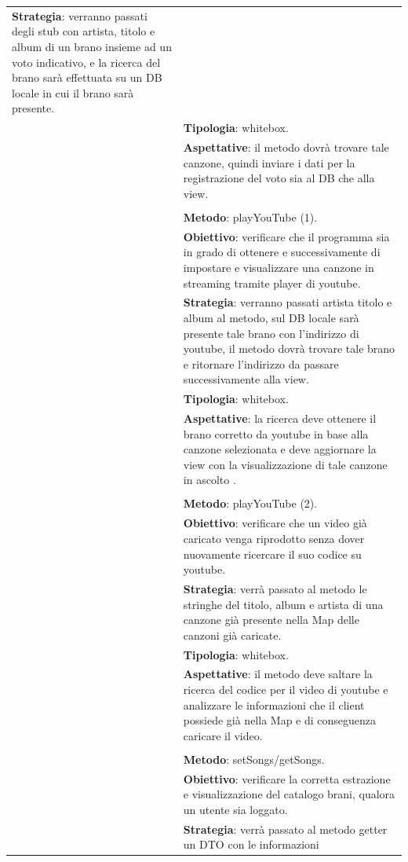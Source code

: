 \begin{footnotesize}
\begin{longtable}{|p{5.7cm}|p{10.3cm}|}
\textbf{Strategia}: verranno passati degli stub con artista, titolo e album di
un brano insieme ad un voto indicativo, e la ricerca del brano sar\`a
effettuata su un DB locale in cui il brano sar\`a presente.\\&
\textbf{Tipologia}: whitebox.\\&
\textbf{Aspettative}: il metodo dovr\`a trovare tale canzone, quindi inviare i
dati per la registrazione del voto sia al DB che alla view.\\&
\\&
\textbf{Metodo}: playYouTube (1).\\&
\textbf{Obiettivo}: verificare che il
programma sia in grado di ottenere e successivamente di impostare e visualizzare una canzone in streaming tramite
player di youtube.\\&
\textbf{Strategia}: verranno passati artista titolo e album al metodo, sul DB
locale sar\`a presente tale brano con l'indirizzo di youtube, il metodo
dovr\`a trovare tale brano e ritornare l'indirizzo da passare successivamente
alla view.\\&
\textbf{Tipologia}: whitebox.\\&
\textbf{Aspettative}: la ricerca deve ottenere il brano corretto
da youtube in base alla canzone selezionata e deve aggiornare la view con la
visualizzazione di tale canzone in ascolto .\\& 
\\&
\textbf{Metodo}: playYouTube (2).\\&
\textbf{Obiettivo}: verificare che un video gi\`a caricato venga
riprodotto senza dover nuovamente ricercare il suo codice su youtube.\\&
\textbf{Strategia}: verr\`a passato al metodo le stringhe del titolo, album e
artista di una canzone gi\`a presente nella Map delle canzoni gi\`a caricate.\\&
\textbf{Tipologia}: whitebox.\\&
\textbf{Aspettative}: il metodo deve saltare la ricerca del codice per il
video di youtube e analizzare le informazioni che il client possiede gi\`a nella
Map e di conseguenza caricare il video.\\&
\\&
\textbf{Metodo}: setSongs/getSongs.\\&
\textbf{Obiettivo}: verificare la corretta estrazione e visualizzazione del
catalogo brani, qualora un utente sia loggato.\\& 
\textbf{Strategia}: verr\`a passato al metodo getter un DTO con le informazioni

\end{longtable}
\end{footnotesize}
